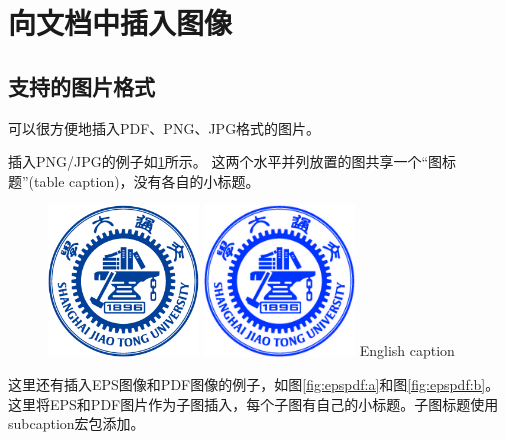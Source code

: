 \documentclass[doctor,openright,twoside]{sjtuthesis}
\theoremstyle{plain}
\theoremstyle{definition}
\theoremstyle{remark}
\theoremstyle{ocrenumbox}
\theoremstyle{plain}
\newcommand\cqh{“}
\newcommand\cqt{”}
\begin{document}
\section{向文档中插入图像}
\label{sec:insertimage}

\subsection{支持的图片格式}
\label{sec:imageformat}

\XeTeX 可以很方便地插入PDF、PNG、JPG格式的图片。

插入PNG/JPG的例子如\ref{fig:SRR}所示。
这两个水平并列放置的图共享一个\cqh 图标题\cqt (table
caption)，没有各自的小标题。

\begin{figure}[!htp]
  \centering
  \includegraphics[width=4cm]{example/sjtulogo.png}
  \hspace{1cm}
  \includegraphics[width=4cm]{example/sjtulogo.jpg}
    {English caption}
  \label{fig:SRR}
\end{figure}

这里还有插入EPS图像和PDF图像的例子，如图\ref{fig:epspdf:a}和图\ref{fig:epspdf:b}。这里将EPS和PDF图片作为子图插入，每个子图有自己的小标题。子图标题使用subcaption宏包添加。
\end{document}
